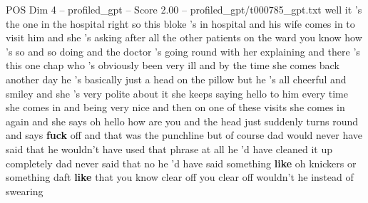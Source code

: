 \begin{textsample}{POS Dim 4 – profiled\_gpt – Score 2.00 – profiled\_gpt/t000785\_gpt.txt}  \label{ex:f4_pos_035}
well it 's the one in the hospital right so this bloke ’s in hospital and his wife comes in to visit him and she ’s asking after all the other patients on the ward you know how ’s so and so doing and the doctor ’s going round with her explaining and there ’s this one chap who ’s obviously been very ill and by the time she comes back another day he ’s basically just a head on the pillow but he ’s all cheerful and smiley and she ’s very polite about it she keeps saying hello to him every time she comes in and being very nice and then on one of these visits she comes in again and she says oh hello how are you and the head just suddenly turns round and says \textbf{fuck} off and that was the punchline but of course dad would never have said that he wouldn't have used that phrase at all he ’d have cleaned it up completely dad never said that no he ’d have said something \textbf{like} oh knickers or something daft \textbf{like} that you know clear off you clear off wouldn't he instead of swearing

\end{textsample}

